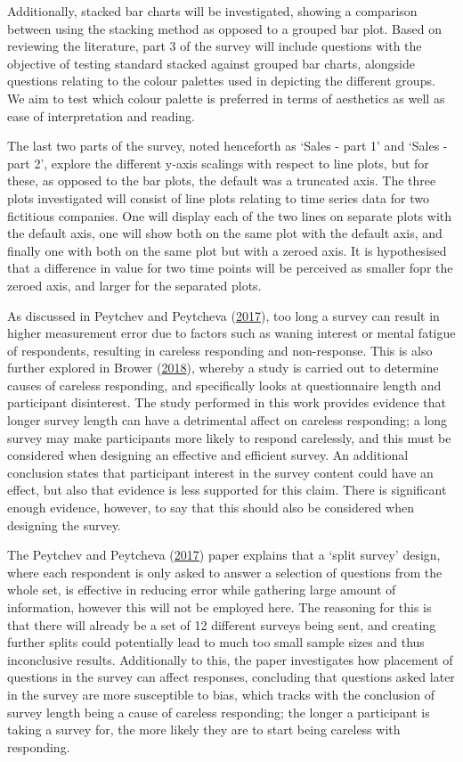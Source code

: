 \documentclass[
  11pt,
]{book}
\begin{document}
Additionally, stacked bar charts will be investigated, showing a
comparison between using the stacking method as opposed to a grouped bar
plot. Based on reviewing the literature, part 3 of the survey will
include questions with the objective of testing standard stacked against
grouped bar charts, alongside questions relating to the colour palettes
used in depicting the different groups. We aim to test which colour
palette is preferred in terms of aesthetics as well as ease of
interpretation and reading.

The last two parts of the survey, noted henceforth as `Sales - part 1'
and `Sales - part 2', explore the different y-axis scalings with respect
to line plots, but for these, as opposed to the bar plots, the default
was a truncated axis. The three plots investigated will consist of line
plots relating to time series data for two fictitious companies. One
will display each of the two lines on separate plots with the default
axis, one will show both on the same plot with the default axis, and
finally one with both on the same plot but with a zeroed axis. It is
hypothesised that a difference in value for two time points will be
perceived as smaller fopr the zeroed axis, and larger for the separated
plots.

As discussed in Peytchev and Peytcheva
(\protect\hyperlink{ref-Peytchev_Peytcheva_2017}{2017}), too long a
survey can result in higher measurement error due to factors such as
waning interest or mental fatigue of respondents, resulting in careless
responding and non-response. This is also further explored in Brower
(\protect\hyperlink{ref-brower}{2018}), whereby a study is carried out
to determine causes of careless responding, and specifically looks at
questionnaire length and participant disinterest. The study performed in
this work provides evidence that longer survey length can have a
detrimental affect on careless responding; a long survey may make
participants more likely to respond carelessly, and this must be
considered when designing an effective and efficient survey. An
additional conclusion states that participant interest in the survey
content could have an effect, but also that evidence is less supported
for this claim. There is significant enough evidence, however, to say
that this should also be considered when designing the survey.

The Peytchev and Peytcheva
(\protect\hyperlink{ref-Peytchev_Peytcheva_2017}{2017}) paper explains
that a `split survey' design, where each respondent is only asked to
answer a selection of questions from the whole set, is effective in
reducing error while gathering large amount of information, however this
will not be employed here. The reasoning for this is that there will
already be a set of 12 different surveys being sent, and creating
further splits could potentially lead to much too small sample sizes and
thus inconclusive results. Additionally to this, the paper investigates
how placement of questions in the survey can affect responses,
concluding that questions asked later in the survey are more susceptible
to bias, which tracks with the conclusion of survey length being a cause
of careless responding; the longer a participant is taking a survey for,
the more likely they are to start being careless with responding.
\end{document}
